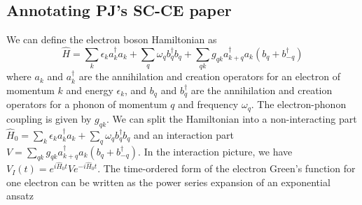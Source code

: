 \subsection{Annotating PJ's SC-CE paper}
We can define the electron boson Hamiltonian as
\begin{equation}
\hat{H}=\sum_k \epsilon_k a_k^{\dagger} a_k + \sum_q \omega_q b_q^{\dagger} b_q + \sum_{q k} g_{q k} a_{k+q}^{\dagger} a_k \left(b_q + b_{-q}^{\dagger}\right)
\end{equation}
where $a_k$ and $a_k^{\dagger}$ are the annihilation and creation operators for an electron of momentum $k$ and energy $\epsilon_k$, and $b_q$ and $b_q^{\dagger}$ are the annihilation and creation operators for a phonon of momentum $q$ and frequency $\omega_q$. The electron-phonon coupling is given by $g_{q k}$. We can split the Hamiltonian into a non-interacting part $\hat{H}_0 = \sum_k \epsilon_k a_k^{\dagger} a_k + \sum_q \omega_q b_q^{\dagger} b_q$ and an interaction part $V = \sum_{q k} g_{q k} a_{k+q}^{\dagger} a_k \left(b_q + b_{-q}^{\dagger}\right)$. In the interaction picture, we have $V_I(t) = e^{i \hat{H}_0 t} V e^{-i \hat{H}_0 t}$.
\label{sec:pj_ce}
 The time-ordered form of the electron Green's function for one electron can be written as the power series expansion of an exponential ansatz
